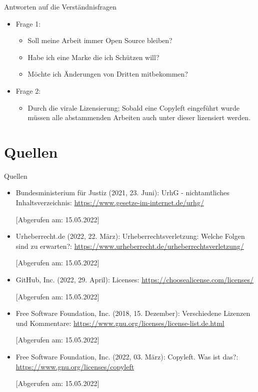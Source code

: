 \documentclass{beamer}
\begin{document}
\begin{frame}{Antworten auf die Verständnisfragen}
	\begin{itemize}
		\item Frage 1: 
			\begin{itemize}
				\item Soll meine Arbeit immer Open Source bleiben? %
				\item Habe ich eine Marke die ich Schützen will? %
				\item Möchte ich Änderungen von Dritten mitbekommen? %
			\end{itemize}
		\item Frage 2: 
			\begin{itemize}
				\item Durch die virale Lizensierung; Sobald eine Copyleft
					eingeführt wurde müssen alle abstammenden Arbeiten auch
					unter dieser lizensiert werden.
			\end{itemize}
	\end{itemize}
\end{frame}

\section{Quellen}
\begin{frame}{Quellen}
	\begin{itemize}
		\item Bundesministerium für Justiz (2021, 23. Juni): UrhG - nichtamtliches Inhaltsverzeichnis:
			\href{https://www.gesetze-im-internet.de/urhg/}{https://www.gesetze-im-internet.de/urhg/}

			[Abgerufen am: 15.05.2022]
		\item Urheberrecht.de (2022, 22. März): Urheberrechtsverletzung: Welche Folgen sind zu erwarten?:
			\href{https://www.urheberrecht.de/urheberrechtsverletzung/}{https://www.urheberrecht.de/urheberrechtsverletzung/}

			[Abgerufen am: 15.05.2022]
		\item GitHub, Inc. (2022, 29. April): Licenses:
			\href{https://choosealicense.com/licenses/}{https://choosealicense.com/licenses/}

			[Abgerufen am: 15.05.2022]
		\item Free Software Foundation, Inc. (2018, 15. Dezember): Verschiedene Lizenzen und Kommentare:
			\href{https://www.gnu.org/licenses/license-list.de.html}{https://www.gnu.org/licenses/license-list.de.html}

			[Abgerufen am: 15.05.2022]
		\item Free Software Foundation, Inc. (2022, 03. März): Copyleft. Was ist das?:
			\href{https://www.gnu.org/licenses/copyleft}{https://www.gnu.org/licenses/copyleft}

			[Abgerufen am: 15.05.2022]
	\end{itemize}

\end{frame}
\end{document}
